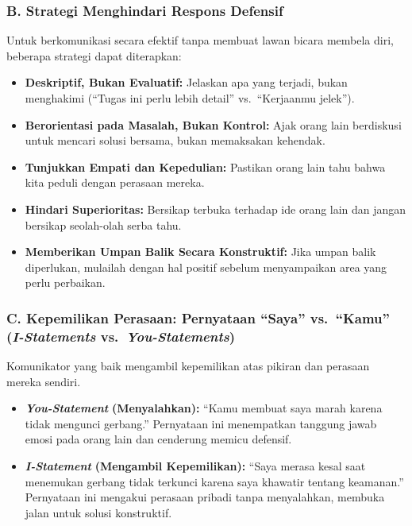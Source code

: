 \documentclass[
  letterpaper,
  DIV=11,
  numbers=noendperiod]{scrreprt}
\begin{document}
\subsubsection{B. Strategi Menghindari Respons
Defensif}\label{b.-strategi-menghindari-respons-defensif}

Untuk berkomunikasi secara efektif tanpa membuat lawan bicara membela
diri, beberapa strategi dapat diterapkan:

\begin{itemize}
\item
  \textbf{Deskriptif, Bukan Evaluatif:} Jelaskan apa yang terjadi, bukan
  menghakimi (``Tugas ini perlu lebih detail'' vs.~``Kerjaanmu jelek'').
\item
  \textbf{Berorientasi pada Masalah, Bukan Kontrol:} Ajak orang lain
  berdiskusi untuk mencari solusi bersama, bukan memaksakan kehendak.
\item
  \textbf{Tunjukkan Empati dan Kepedulian:} Pastikan orang lain tahu
  bahwa kita peduli dengan perasaan mereka.
\item
  \textbf{Hindari Superioritas:} Bersikap terbuka terhadap ide orang
  lain dan jangan bersikap seolah-olah serba tahu.
\item
  \textbf{Memberikan Umpan Balik Secara Konstruktif:} Jika umpan balik
  diperlukan, mulailah dengan hal positif sebelum menyampaikan area yang
  perlu perbaikan.
\end{itemize}

\subsubsection{\texorpdfstring{C. Kepemilikan Perasaan: Pernyataan
``Saya'' vs.~``Kamu'' (\emph{I-Statements}
vs.~\emph{You-Statements})}{C. Kepemilikan Perasaan: Pernyataan ``Saya'' vs.~``Kamu'' (I-Statements vs.~You-Statements)}}\label{c.-kepemilikan-perasaan-pernyataan-saya-vs.-kamu-i-statements-vs.-you-statements}

Komunikator yang baik mengambil kepemilikan atas pikiran dan perasaan
mereka sendiri.

\begin{itemize}
\item
  \textbf{\emph{You-Statement}} \textbf{(Menyalahkan):} ``Kamu membuat
  saya marah karena tidak mengunci gerbang.'' Pernyataan ini menempatkan
  tanggung jawab emosi pada orang lain dan cenderung memicu defensif.
\item
  \textbf{\emph{I-Statement}} \textbf{(Mengambil Kepemilikan):} ``Saya
  merasa kesal saat menemukan gerbang tidak terkunci karena saya
  khawatir tentang keamanan.'' Pernyataan ini mengakui perasaan pribadi
  tanpa menyalahkan, membuka jalan untuk solusi konstruktif.
\end{itemize}
\end{document}
